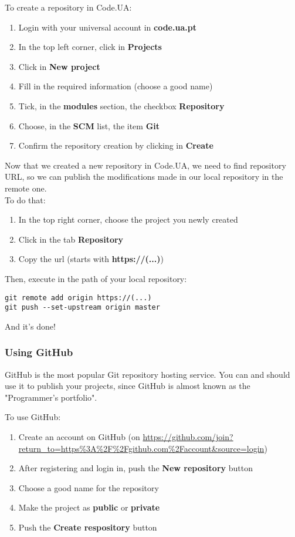 \documentclass{article}
\begin{document}
To create a repository in Code.UA:

\begin{enumerate}
\item Login with your universal account in\underline{} \textbf{code.ua.pt}
\item In the top left corner, click in \textbf{Projects}
\item Click in \textbf{New project}
\item Fill in the required information (choose a good name)
\item Tick, in the \textbf{modules} section, the checkbox \textbf{Repository}
\item Choose, in the \textbf{SCM} list, the item \textbf{Git}
\item Confirm the repository creation by clicking in \textbf{Create}
\end{enumerate}

Now that we created a new repository in Code.UA, we need to find repository URL, so we can publish the modifications made in our local repository in the\underline{} remote one.\\

To do that:

\begin{enumerate}
\item In the top right corner, choose the project you newly created
\item Click in the tab \textbf{Repository}
\item Copy the url (starts with \textbf{https://(...)\underline{}})
\end{enumerate}

Then, execute in the path of your local repository:

\begin{lstlisting}
git remote add origin https://(...)
git push --set-upstream origin master
\end{lstlisting}

And it's done!

\subsubsection{Using GitHub}

GitHub is the most popular Git repository hosting service. You can and should use it to publish your projects, since GitHub is almost known as the "Programmer's portfolio".

To use GitHub:

\begin{enumerate}
\item Create an account on GitHub (on \url{https://github.com/join?return_to=https%3A%2F%2Fgithub.com%2Faccount&source=login})
\item After registering and login in, push the \textbf{New repository} button
\item Choose a good name for the repository
\item Make the project as \textbf{public} or \textbf{private}
\item Push the \textbf{Create respository} button
\end{enumerate}
\end{document}
